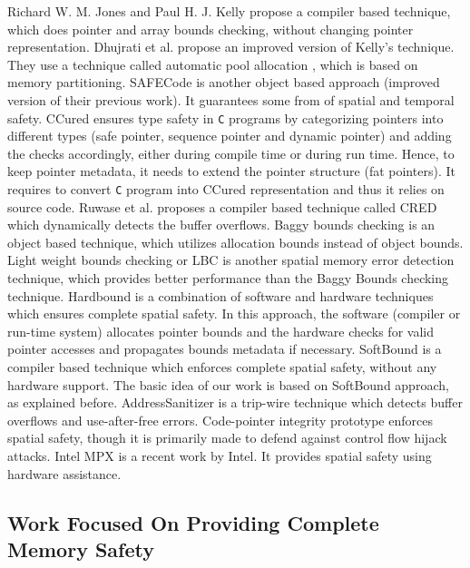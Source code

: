 Richard W. M. Jones and Paul H. J. Kelly \citep{jones1997backwards} propose a compiler based technique, which does pointer and array bounds checking, without changing pointer representation. Dhujrati et al. \citep{dhurjati2006backwards} propose an improved version of Kelly's technique. They use a technique called automatic pool allocation \citep{lattner2005automatic}, which is based on memory partitioning. SAFECode \citep{dhurjati2006safecode} is another object based approach (improved version of their previous work). It guarantees some from of spatial and temporal safety. CCured \citep{Necula:2002:CTR:565816.503286} ensures type safety in \texttt{C} programs by categorizing pointers into different types (safe pointer, sequence pointer and dynamic pointer) and adding the checks accordingly, either during compile time or during run time. Hence, to keep pointer metadata, it needs to extend the pointer structure (fat pointers). It requires to convert \texttt{C} program into CCured representation and thus it relies on source code. Ruwase et al. proposes a compiler based technique called CRED \citep{ruwase2004practical} which dynamically detects the buffer overflows. Baggy bounds checking \citep{akritidis2009baggy} is an object based technique, which utilizes allocation bounds instead of object bounds. Light weight bounds checking or LBC \citep{Hasabnis:2012:LBC:2259016.2259034} is another spatial memory error detection technique, which provides better performance than the Baggy Bounds checking technique. Hardbound \citep{devietti2008hardbound} is a combination of software and hardware techniques which ensures complete spatial safety. In this approach, the software (compiler or run-time system) allocates pointer bounds and the hardware checks for valid pointer accesses and propagates bounds metadata if necessary. SoftBound \citep{nagarakatte2009softbound} is a compiler based technique which enforces complete spatial safety, without any hardware support. The basic idea of our work is based on SoftBound approach, as explained before. AddressSanitizer \citep{serebryany2012addresssanitizer} is a trip-wire technique which detects buffer overflows and use-after-free errors. Code-pointer integrity \citep{kuznetsov2014code} prototype enforces spatial safety, though it is primarily made to defend against control flow hijack attacks. Intel MPX \citep{oleksenko2017intel} is a recent work by Intel. It provides spatial safety using hardware assistance.

\subsection{Work Focused On Providing Complete Memory Safety}

